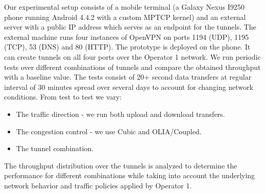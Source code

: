 Our experimental setup consists of a mobile terminal (a Galaxy Nexus I9250 phone running Android 4.4.2 with a custom MPTCP kernel) and an external server with a public IP address which serves as an endpoint for the tunnels. The external machine runs four instances of OpenVPN on ports 1194 (UDP), 1195 (TCP), 53 (DNS) and 80 (HTTP). The prototype is deployed on the phone. It can create tunnels on all four ports over the Operator 1 network. We run periodic tests over different combinations of tunnels and compare the obtained throughput with a baseline value. The tests consist of 20+ second data transfers at regular interval of 30 minutes spread over several days to account for changing network conditions. From test to test we vary:

\begin{itemize}
\item The traffic direction - we run both upload and download transfers.
\item The congestion control - we use Cubic and OLIA/Coupled.
\item The tunnel combination.
\end{itemize}

The throughput distribution over the tunnels is analyzed to determine the performance for different combinations while taking into account the underlying network behavior and traffic policies applied by Operator 1.